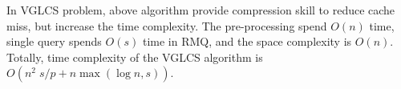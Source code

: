 In VGLCS problem, above algorithm provide compression skill to reduce
cache miss, but increase the time complexity.  The pre-processing spend
$O(n)$ time, single query spends $O(s)$ time in RMQ, and the space
complexity is  $O(n)$.  Totally, time complexity of the VGLCS algorithm
is $O(n^2 \; s / p + n \max(\log n, s))$.

\iffalse
回到 VGLCS 的應用中，上述算法使用壓縮方式降低快取未中。
我們可以使用上述的算法取代原先的并查集，建表的時間複雜度為 $O(n)$，
單一查詢的時間複雜度為 $O(s)$。
整體的時間複雜度為 $O(n^2 \; s / p + n \max(\log n, s))$。
\fi
